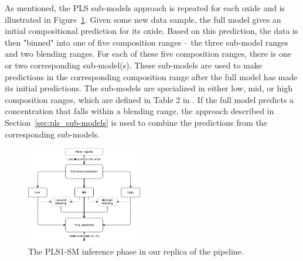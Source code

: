 As mentioned, the PLS sub-models approach is repeated for each oxide and is illustrated in Figure~\ref{fig:pls_inference}.
Given some new data sample, the full model gives an initial compositional prediction for its oxide.
Based on this prediction, the data is then "binned" into one of five composition ranges -- the three sub-model ranges and two blending ranges.
For each of these five composition ranges, there is one or two corresponding sub-model(s).
These sub-models are used to make predictions in the corresponding composition range after the full model has made its initial predictions.
The sub-models are specialized in either low, mid, or high composition ranges, which are defined in Table 2 in \citet{andersonImprovedAccuracyQuantitative2017}.
If the full model predicts a concentration that falls within a blending range, the approach described in Section~\ref{sec:pls_sub-models} is used to combine the predictions from the corresponding sub-models.

\begin{figure}
	\centering
	\includegraphics[width=0.45\textwidth]{images/pls_inference.png}
	\caption{The PLS1-SM inference phase in our replica of the pipeline.}
	\label{fig:pls_inference}
\end{figure}

